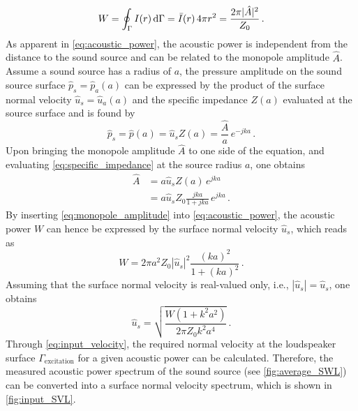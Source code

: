 {\begin{equation}
	W = \oint_{\Gamma} I(r) \dif\Gamma = \bar{I}(r)\,4\pi r^2 = \frac{2\pi |\hat{A}|^2}{Z_0}\,. \label{eq:acoustic_power}
\end{equation}
As apparent in \cref{eq:acoustic_power}, the acoustic power is independent from the distance to the sound source and can be related to the monopole amplitude $\hat{A}$. Assume a sound source has a radius of $a$, the pressure amplitude on the sound source surface $\hat{p}_s = \hat{p}_a(a)$ can be expressed by the product of the surface normal velocity $\hat{u}_s = \hat{u}_a(a)$ and the specific impedance $Z(a)$ evaluated at the source surface and is found by
\begin{equation}
	\hat{p}_s = \hat{p}(a) = \hat{u}_s Z(a) = \frac{\hat{A}}{a}\,e^{-jka}\,.
\end{equation}
Upon bringing the monopole amplitude $\hat{A}$ to one side of the equation, and evaluating \cref{eq:specific_impedance} at the source radius $a$, one obtains
\begin{align}
	\hat{A} &= a\hat{u}_s Z(a)\,e^{jka} \\
			&= a\hat{u}_s Z_0 \frac{jka}{1+jka}\,e^{jka}\,. \label{eq:monopole_amplitude}
\end{align}
By inserting \cref{eq:monopole_amplitude} into \cref{eq:acoustic_power}, the acoustic power $W$ can hence be expressed by the surface normal velocity $\hat{u}_s$, which reads as
\begin{equation}
	W = 2\pi a^2 Z_0 \left|\hat{u}_s\right|^2\frac{(ka)^2}{1+(ka)^2} \,.
\end{equation}
Assuming that the surface normal velocity is real-valued only, i.e., $\left|\hat{u}_s\right| = \hat{u}_s$, one obtains
\begin{equation}
	\hat{u}_s = \sqrt{\frac{W(1 + k^2a^2)}{2\pi Z_0 k^2a^4}}\,. \label{eq:input_velocity}
\end{equation}
Through \cref{eq:input_velocity}, the required normal velocity at the loudspeaker surface $\Gamma_{\text{excitation}}$ for a given acoustic power can be calculated. Therefore, the measured acoustic power spectrum of the sound source (see \cref{fig:average_SWL}) can be converted into a surface normal velocity spectrum, which is shown in \cref{fig:input_SVL}.

}
